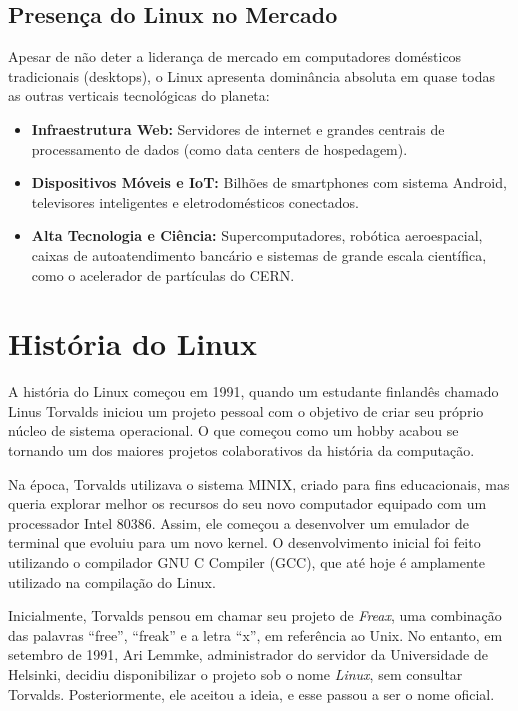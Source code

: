 \documentclass{article}
\begin{document}
\subsection{Presença do Linux no Mercado}
Apesar de não deter a liderança de mercado em computadores domésticos tradicionais (desktops), o Linux apresenta dominância absoluta em quase todas as outras verticais tecnológicas do planeta:
\begin{itemize}
    \item \textbf{Infraestrutura Web:} Servidores de internet e grandes centrais de processamento de dados (como data centers de hospedagem).
    \item \textbf{Dispositivos Móveis e IoT:} Bilhões de smartphones com sistema Android, televisores inteligentes e eletrodomésticos conectados.
    \item \textbf{Alta Tecnologia e Ciência:} Supercomputadores, robótica aeroespacial, caixas de autoatendimento bancário e sistemas de grande escala científica, como o acelerador de partículas do CERN.
\end{itemize}



\section{História do Linux}
A história do Linux começou em 1991, quando um estudante finlandês chamado Linus Torvalds iniciou um projeto pessoal com o objetivo de criar seu próprio núcleo de sistema operacional.
O que começou como um hobby acabou se tornando um dos maiores projetos colaborativos da história da computação.

Na época, Torvalds utilizava o sistema MINIX, criado para fins educacionais, mas queria explorar melhor os recursos do seu novo computador equipado com um processador Intel 80386. Assim, ele começou a desenvolver um emulador de terminal que evoluiu para um novo kernel.
O desenvolvimento inicial foi feito utilizando o compilador GNU C Compiler (GCC), que até hoje é amplamente utilizado na compilação do Linux.

Inicialmente, Torvalds pensou em chamar seu projeto de \textit{Freax}, uma combinação das palavras ``free'', ``freak'' e a letra ``x'', em referência ao Unix. No entanto, em setembro de 1991, Ari Lemmke, administrador do servidor da Universidade de Helsinki, decidiu disponibilizar o projeto sob o nome \textit{Linux}, sem consultar Torvalds.
Posteriormente, ele aceitou a ideia, e esse passou a ser o nome oficial.
\end{document}
